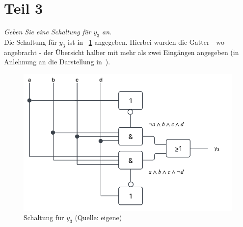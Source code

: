 \section{Teil 3}

\textit{Geben Sie eine Schaltung für $y_3$ an.}\\


\noindent
Die Schaltung für $y_3$ ist in ~\ref{fig:schaltplan_y3} angegeben.
Hierbei wurden die Gatter - wo angebracht - der Übersicht halber mit mehr als zwei Eingängen angegeben (in Anlehnung an die Darstellung in~\cite[\textbf{Abbildung 24}, 57]{BL22}).

\begin{figure}
    \centering
    \includegraphics[scale=0.5]{aufgabe 2/img/schaltplan_y3}
    \caption{Schaltung für $y_3$ (Quelle: eigene)}
    \label{fig:schaltplan_y3}
\end{figure}

